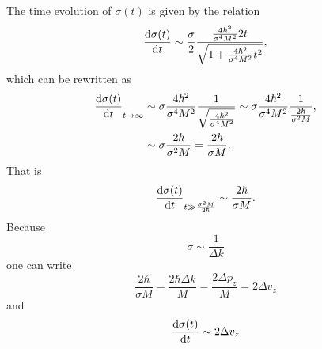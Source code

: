 The time evolution of $\sigma(t)$ is given by the relation
\begin{equation}
\nonumber
\frac{{\rm d}\sigma(t)}{{\rm d}t} \sim \frac{\sigma}{2} \frac{\frac{4 \hbar^2}{\sigma^4 M^2} 2 t}{\sqrt{1 + \frac{4 \hbar^2}{\sigma^4 M^2} t^2}},
\end{equation}
which can be rewritten as
\begin{equation}
\nonumber
\begin{split}
\frac{{\rm d}\sigma(t)}{{\rm d}t}_{t \rightarrow \infty} &\sim \sigma \frac{4 \hbar^2}{\sigma^4 M^2} \frac{1}{\sqrt{\frac{4 \hbar^2}{\sigma^4 M^2}}} \sim \sigma \frac{4 \hbar^2}{\sigma^4 M^2} \frac{1}{\frac{2 \hbar}{\sigma^2 M}}, \\
&\sim \sigma \frac{2 \hbar}{\sigma^2 M} = \frac{2 \hbar}{\sigma M}.
\end{split}
\end{equation}
That is
\begin{equation*}
\frac{{\rm d}\sigma(t)}{{\rm d}t}_{t \gg \frac{\sigma^2 M}{2 \hbar}} \sim \frac{2 \hbar}{\sigma M}.
\end{equation*}
Because
\begin{equation}
\nonumber
\sigma \sim \frac{1}{\Delta k}
\end{equation}
one can write
\begin{equation}
\nonumber
\frac{2 \hbar}{\sigma M} = \frac{2 \hbar \Delta k}{M} = \frac{2 \Delta p_z}{M} = 2 \Delta v_z
\end{equation}
and 
\begin{equation*}
\frac{{\rm d}\sigma(t)}{{\rm d}t} \sim 2 \Delta v_z
\end{equation*}

